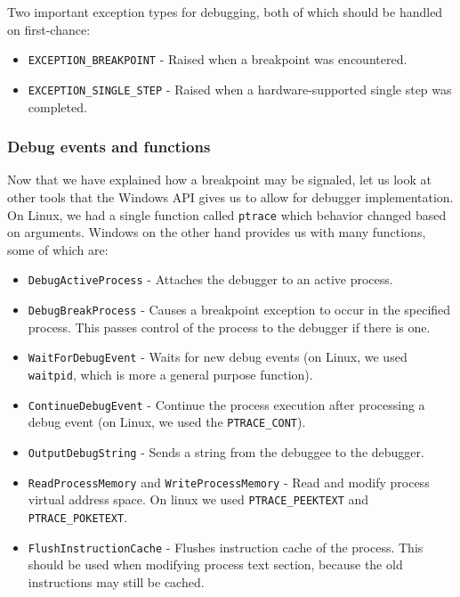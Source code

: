 Two important exception types for debugging, both of which should be handled on
first-chance:
\begin{itemize}
    \item \texttt{EXCEPTION\_BREAKPOINT} - Raised when a breakpoint was encountered.
    \item \texttt{EXCEPTION\_SINGLE\_STEP} - Raised when a hardware-supported
        single step was completed.
\end{itemize}

\subsubsection{Debug events and functions}
Now that we have explained how a breakpoint may be signaled, let us look at
other tools that the Windows API gives us to allow for debugger implementation.
On Linux, we had a single function called \texttt{ptrace} which behavior
changed based on arguments. Windows on the other hand provides us with many
functions, some of which are:

\begin{itemize}
    \item \texttt{DebugActiveProcess} - Attaches the debugger to an
        active process.
    \item \texttt{DebugBreakProcess} - Causes a breakpoint exception to
        occur in the specified process. This passes control of the process to
        the debugger if there is one.
    \item \texttt{WaitForDebugEvent} - Waits for new debug events (on
        Linux, we used \texttt{waitpid}, which is more a general purpose
        function).
    \item \texttt{ContinueDebugEvent} - Continue the process execution
        after processing a debug event (on Linux, we used the
        \texttt{PTRACE\_CONT}).
    \item \texttt{OutputDebugString} - Sends a string from the debuggee
        to the debugger.
    \item \texttt{ReadProcessMemory} and
    \texttt{WriteProcessMemory} - Read and modify process virtual
        address space. On linux we used \texttt{PTRACE\_PEEKTEXT} and
        \texttt{PTRACE\_POKETEXT}.
    \item \texttt{FlushInstructionCache} - Flushes instruction cache of
        the process. This should be used when modifying process text section,
        because the old instructions may still be cached.
\end{itemize}

